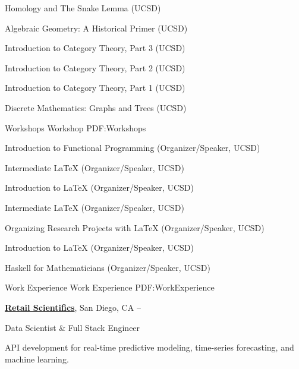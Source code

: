 \documentclass[letterpaper,MMMyyyy,nonstopmode]{simpleresumecv}
\begin{document}
\begin{Body}
\BulletItem
Homology and The Snake Lemma (UCSD)
\hfill {}

\BulletItem
Algebraic Geometry: A Historical Primer (UCSD)
\hfill {}

\BulletItem
Introduction to Category Theory, Part 3 (UCSD)
\hfill {}

\BulletItem
Introduction to Category Theory, Part 2 (UCSD)
\hfill {}

\BulletItem
Introduction to Category Theory, Part 1 (UCSD)
\hfill {}

\BulletItem
Discrete Mathematics: Graphs and Trees (UCSD)
\hfill {}

\Section
{Workshops}
{Workshop}
{PDF:Workshops}

\BulletItem
Introduction to Functional Programming 
(Organizer/Speaker, UCSD)
\hfill {}

\BulletItem
Intermediate \LaTeX
(Organizer/Speaker, UCSD)
\hfill {}

\BulletItem
Introduction to \LaTeX
(Organizer/Speaker, UCSD)
\hfill {}

\BulletItem
Intermediate \LaTeX
(Organizer/Speaker, UCSD)
\hfill {}

\BulletItem
Organizing Research Projects with \LaTeX
(Organizer/Speaker, UCSD)
\hfill {}

\BulletItem
Introduction to \LaTeX 
(Organizer/Speaker, UCSD)
\hfill {}

\BulletItem
Haskell for Mathematicians
(Organizer/Speaker, UCSD)
\hfill {}


\Section
{Work Experience}
{Work Experience}
{PDF:WorkExperience}

\Entry
\href{https://www.retailscientifics.com/}
{\textbf{Retail Scientifics}},
San Diego, CA
\hfill
{} --

\Gap
\BulletItem
Data Scientist \& Full Stack Engineer

\begin{Detail}
\SubBulletItem
API development for real-time predictive modeling, time-series forecasting, and machine learning.
\end{Detail}


\end{Body}
\end{document}
